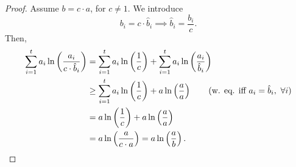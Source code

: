 \begin{proof}
	Assume $b = c \cdot a$, for $c \neq 1$.
	We introduce
	\begin{equation*}
		b_i = c \cdot \hat{b}_i \implies \hat{b}_i = \frac{b_i}{c}.
	\end{equation*}
	Then,
	\begin{align*}
		\sum_{i = 1}^{t} a_i \ln \left( \frac{a_i}{c \cdot \hat{b}_i} \right)
		& =
		\sum_{i = 1}^{t} a_i \ln \left( \frac{1}{c} \right) + \sum_{i = 1}^{t} a_i \ln \left( \frac{a_i}{\hat{b}_i} \right)
		\\
		& \ge
		\sum_{i = 1}^{t} a_i \ln \left( \frac{1}{c} \right) + a \ln \left( \frac{a}{a} \right)
		\tag{w. eq. iff $a_i = \hat{b}_i,\ \forall i$}
		\\
		& =
		a \ln \left( \frac{1}{c} \right) + a \ln \left( \frac{a}{a} \right)
		\\
		& =
		a \ln \left( \frac{a}{c \cdot a} \right)
		=
		a \ln \left( \frac{a}{b} \right). \qedhere
	\end{align*}
\end{proof}
